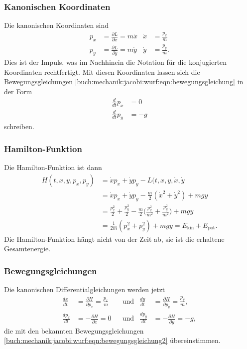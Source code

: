 %
%
\subsubsection{Kanonischen Koordinaten}
%
Die kanonischen Koordinaten sind
\begin{align*}
p_x &= \frac{\partial L}{\partial \dot{x}} = m\dot{x}
&
\dot{x}
&=
\frac{p_x}{m}
\\
p_y &= \frac{\partial L}{\partial \dot{y}} = m\dot{y}
&
\dot{y}
&=
\frac{p_y}{m}.
\end{align*}
Dies ist der Impuls, was im Nachhinein die Notation für die
%
konjugierten Koordinaten rechtfertigt.
Mit diesen Koordinaten lassen sich die Bewegungsgleichungen 
\eqref{buch:mechanik:jacobi:wurf:eqn:bewegungsgleichung} in der
Form
\begin{equation}
\begin{aligned}
\frac{d}{dt}p_x &= 0\\
\frac{d}{dt}p_y &= -g
\end{aligned}
\label{buch:mechanik:jacobi:wurf:eqn:bewegungsgleichung2}
\end{equation}
schreiben.

%
%
\subsubsection{Hamilton-Funktion}
Die Hamilton-Funktion ist dann
%
\begin{align*}
H(t,x,y,p_x,p_y)
&=
\dot{x}p_x
+
\dot{y}p_y
-
L(t,x,y,\dot{x},\dot{y}
\\
&=
\dot{x}p_x
+
\dot{y}p_y
-
\frac{m}2(\dot{x}^2+\dot{y}^2)
+mgy
\\
&=
\frac{p_x^2}{2}
+
\frac{p_y^2}{2}
-
\frac{m}2\biggl(\frac{p_x^2}{m^2} + \frac{p_y^2}{m^2}\biggr) + mgy
\\
&=
\frac{1}{2m}(p_x^2+p_y^2) + mgy
=
E_{\text{kin}} + E_{\text{pot}}.
\end{align*}
Die Hamilton-Funktion hängt nicht von der Zeit ab, sie ist die erhaltene
Gesamtenergie.

%
%
\subsubsection{Bewegungsgleichungen}
Die kanonischen Differentialgleichungen werden jetzt
\begin{align*}
\frac{dx}{dt}
&=
\frac{\partial H}{\partial p_x}
=
\frac{p_x}{m}
&&\text{und}&
\frac{dy}{dt}
&=
\frac{\partial H}{\partial p_y}
=
\frac{p_y}{m},
\\
\frac{dp_x}{dt}
&=
-\frac{\partial H}{\partial x}
=
0
&&\text{und}&
\frac{dp_y}{dt}
&=
-\frac{\partial H}{\partial y}
=
-g,
\end{align*}
die mit den bekannten Bewegungsgleichungen
%
\eqref{buch:mechanik:jacobi:wurf:eqn:bewegungsgleichung2}
übereinstimmen.

